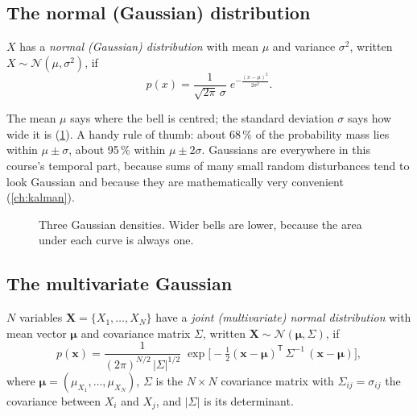 \documentclass[11pt, oneside]{book}
\newcommand{\abs}[1]{\left\lvert #1 \right\rvert}
\newcommand{\T}{^{\mathsf{T}}}           %
\newcommand{\Normal}{\mathcal{N}}
\newcommand{\bX}{\mathbf{X}}  \newcommand{\bY}{\mathbf{Y}}
\newcommand{\bx}{\mathbf{x}}  \newcommand{\by}{\mathbf{y}}
\let\originalsubsection\subsection
\renewcommand{\subsection}{\Needspace{6\baselineskip}\originalsubsection}
\begin{document}
\subsection{The normal (Gaussian) distribution}

\begin{defbox}[title={Normal distribution}]
$X$ has a \emph{normal (Gaussian) distribution} with mean $\mu$ and variance
$\sigma^2$, written $X \sim \Normal(\mu, \sigma^2)$, if
\[
p(x) = \frac{1}{\sqrt{2\pi}\,\sigma}\; e^{-\frac{(x - \mu)^2}{2\sigma^2}} .
\]
\end{defbox}

The mean $\mu$ says where the bell is centred; the standard deviation $\sigma$
says how wide it is (\cref{fig:gaussians}). A handy rule of thumb: about
68\,\% of the probability mass lies within $\mu \pm \sigma$, about 95\,\%
within $\mu \pm 2\sigma$. Gaussians are everywhere in this course's temporal
part, because sums of many small random disturbances tend to look Gaussian and
because they are mathematically very convenient (\cref{ch:kalman}).

\begin{figure}[htbp]
\centering
{}
\caption{Three Gaussian densities. Wider bells are lower, because the area
under each curve is always one.}
\label{fig:gaussians}
\end{figure}

\subsection{The multivariate Gaussian}

\begin{defbox}[title={Multivariate normal distribution}]
$N$ variables $\bX = \{X_1, \ldots, X_N\}$ have a \emph{joint (multivariate)
normal distribution} with mean vector $\bm{\mu}$ and covariance matrix
$\Sigma$, written $\bX \sim \Normal(\bm{\mu}, \Sigma)$, if
\[
p(\bx) = \frac{1}{(2\pi)^{N/2}\,\abs{\Sigma}^{1/2}}\;
\exp\!\Big[-\tfrac{1}{2}(\bx - \bm{\mu})\T\, \Sigma^{-1}\, (\bx - \bm{\mu})\Big],
\]
where $\bm{\mu} = (\mu_{X_1}, \ldots, \mu_{X_N})$, $\Sigma$ is the $N \times N$
covariance matrix with $\Sigma_{ij} = \sigma_{ij}$ the covariance between
$X_i$ and $X_j$, and $\abs{\Sigma}$ is its determinant.
\end{defbox}
\end{document}
